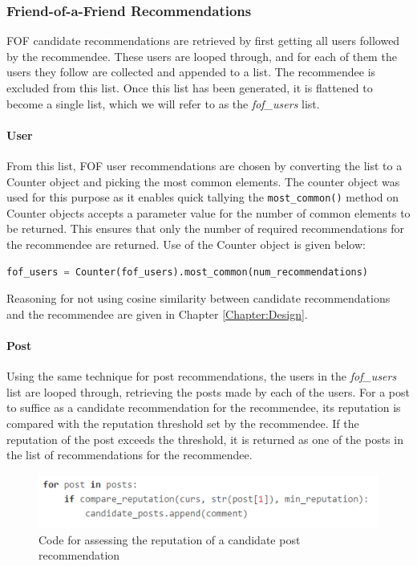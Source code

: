 \subsubsection{Friend-of-a-Friend Recommendations}
FOF candidate recommendations are retrieved by first getting all users followed by the recommendee. These users are looped through, and for each of them the users they follow are collected and appended to a list. The recommendee is excluded from this list. Once this list has been generated, it is flattened to become a single list, which we will refer to as the \textit{fof\_users} list.

\paragraph{User} From this list, FOF user recommendations are chosen by converting the list to a Counter object and picking the most common elements. The counter object was used for this purpose as it enables quick tallying \cite{Python:Counter} the \texttt{most\_common()} method on Counter objects accepts a parameter value for the number of common elements to be returned. This ensures that only the number of required recommendations for the recommendee are returned. Use of the Counter object is given below:

\begin{lstlisting}[language=python]
	fof_users = Counter(fof_users).most_common(num_recommendations)
\end{lstlisting}

Reasoning for not using cosine similarity between candidate recommendations and the recommendee are given in Chapter \ref{Chapter:Design}.

\paragraph{Post} Using the same technique for post recommendations, the users in the \textit{fof\_users} list are looped through, retrieving the posts made by each of the  users. For a post to suffice as a candidate recommendation for the recommendee, its reputation is compared with the reputation threshold set by the recommendee. If the reputation of the post exceeds the threshold, it is returned as one of the posts in the list of recommendations for the recommendee.

\begin{figure}[H]
\centering
\includegraphics[height=0.7in]{Images/Implementation/FOFPostReputation}
\caption{Code for assessing the reputation of a candidate post recommendation}
\label{fig:FOFPostReputation}
\end{figure} 


